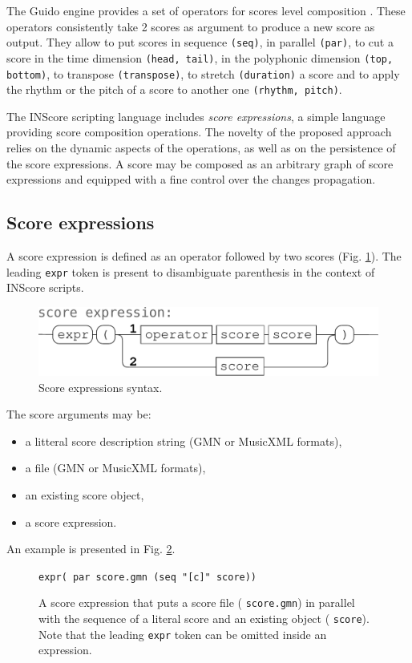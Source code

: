 \documentclass[11pt,a4paper]{article}
\newcommand{\OSC}[1]	{{\fontsize{10pt}{10pt} \selectfont\texttt{#1}}}
\newcommand{\sample}[1]	{\vspace{-0.2em}\begin{center}\colorbox{mygrey}{\begin{minipage}[t]{0.98\columnwidth} {\small \texttt{#1}}\end{minipage}}\end{center}}
\begin{document}
The Guido engine provides a set of operators for scores level composition \cite{fober12b}. These operators consistently take 2 scores as argument to produce a new score as output. They allow to put scores in sequence \OSC{(seq)}, in parallel \OSC{(par)}, to cut a score in the time dimension \OSC{(head, tail)}, in the polyphonic dimension \OSC{(top, bottom)}, to transpose \OSC{(transpose)}, to stretch \OSC{(duration)} a score and to apply the rhythm or the pitch of a score to another one \OSC{(rhythm, pitch)}.

The INScore scripting language includes \emph{score expressions}, a simple language providing score composition operations. 
The novelty of the proposed approach relies on the dynamic aspects of the operations, as well as on the persistence of the score expressions. A score may be composed as an arbitrary graph of score expressions and equipped with a fine control over the changes propagation.

\subsection{Score expressions}

A score expression is defined as an operator followed by two scores (Fig. \ref{fig:scexpr}). The leading \OSC{expr} token is present to disambiguate parenthesis in the context of INScore scripts.
\begin{figure}[ht]
\begin{center}
	\includegraphics[width=1.\columnwidth]{imgs/score-expr}
\caption{Score expressions syntax.}
\label{fig:scexpr}
\end{center}
\end{figure}

The score arguments may be:
\begin{itemize}
\item a litteral score description string (GMN or MusicXML formats),
\item a file (GMN or MusicXML formats),
\item an existing score object,
\item a score expression.
\end{itemize}
An example is presented in Fig. \ref{fig:scex1}.
\begin{figure}[ht]
\begin{center}
\sample{expr( par score.gmn (seq "[c]" score))
}
\caption{A score expression that puts a score file (\OSC{score.gmn}) in parallel with the sequence of a literal score and an existing object (\OSC{score}). Note that the leading \OSC{expr} token can be omitted inside an expression.}
\label{fig:scex1}
\end{center}
\end{figure}
\end{document}
